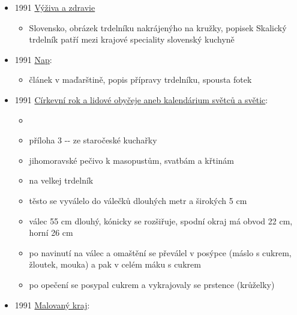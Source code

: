 \begin{itemize}
  \begin{itemize}
  \tightlist
  \item
  \item
    není online, 
  \item
    s. 123: šumajstry, chechmy a liťáky, trdelníky, fargače a turkyňová
    palenta, kraple, bukance, maděry, vaňajze a šusteky, glipry s
  \item
    s. 124: přišel za mnou kaprál, hubu ještě mastnou od trdelníku,
    šumajstry nebo snad bukance, a když jsem po něm ani neotočil hlavu
  \end{itemize}
\item
  1991
  \href{https://dikda.snk.sk/uuid/uuid:7e3fed6a-4442-4a06-9976-aac07df998ce}{Výživa
  a zdravie}

  \begin{itemize}
  \tightlist
  \item
    Slovensko, obrázek trdelníku nakrájenýho na kružky, popisek Skalický
    trdelník patří mezi krajové speciality slovenský kuchyně
  \end{itemize}
\item
  1991
  \href{https://dikda.snk.sk/uuid/uuid:fa8b23b1-0cee-454b-898b-73643d919956}{Nap}:

  \begin{itemize}
  \tightlist
  \item
    článek v maďarštině, popis přípravy trdelníku, spousta fotek
  \end{itemize}
\item
  1991
  \href{https://ceskadigitalniknihovna.cz/uuid/uuid:c0d88b90-df55-11e6-b333-5ef3fc9ae867}{Církevní
  rok a lidové obyčeje aneb kalendárium světců a světic}:

  \begin{itemize}
  \tightlist
  \item
  \item
    příloha 3 -\/- ze staročeské kuchařky
  \item
    jihomoravské pečivo k masopustům, svatbám a křtinám
  \item
     na velkej trdelník
  \item
    těsto se vyválelo do válečků dlouhých metr a širokých 5 cm
  \item
    válec 55 cm dlouhý, kónicky se rozšiřuje, spodní okraj má obvod 22
    cm, horní 26 cm
  \item
    po navinutí na válec a omaštění se převálel v posýpce (máslo s
    cukrem, žloutek, mouka) a pak v celém máku s cukrem
  \item
    po opečení se posypal cukrem a vykrajovaly se prstence (krůželky)
  \end{itemize}
\item
  1991
  \href{https://ceskadigitalniknihovna.cz/uuid/uuid:b0598360-1be3-11e4-a8ab-001018b5eb5c}{Malovaný
  kraj}:


\end{itemize}
